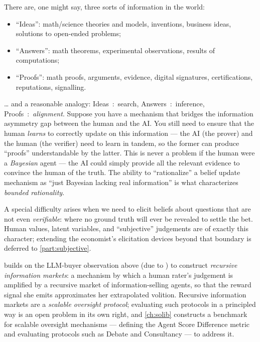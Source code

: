 There are, one might say, three sorts of information in the world:
\begin{itemize}
\item ``Ideas'': math/science theories and models, inventions, business ideas, solutions to open-ended problems;
\item ``Answers'': math theorems, experimental observations, results of computations;
\item ``Proofs'': math proofs, arguments, evidence, digital signatures, certifications, reputations, signalling.
\end{itemize}
\ldots{} and a reasonable analogy: Ideas~:~search, Answers~:~inference, Proofs~:~\emph{alignment}. Suppose you have a mechanism that bridges the information asymmetry gap between the human and the AI. You still need to ensure that the human \emph{learns} to correctly update on this information --- the AI (the prover) and the human (the verifier) need to learn in tandem, so the former can produce ``proofs'' understandable by the latter. This is never a problem if the human were a \emph{Bayesian} agent --- the AI could simply provide all the relevant evidence to convince the human of the truth. The ability to ``rationalize'' a belief update mechanism as ``just Bayesian lacking real information'' is what characterizes \emph{bounded rationality}.

\begin{draftblock}
A special difficulty arises when we need to elicit beliefs about questions that are not even \emph{verifiable}: where no ground truth will ever be revealed to settle the bet. Human values, latent variables, and ``subjective'' judgements are of exactly this character; extending the economist's elicitation devices beyond that boundary is deferred to \cref{part:subjective}.

 builds on the LLM-buyer observation above (due to \citealt{weissRedesigningInformationMarkets2024}) to construct \emph{recursive information markets}: a mechanism by which a human rater's judgement is amplified by a recursive market of information-selling agents, so that the reward signal she emits approximates her extrapolated volition. Recursive information markets are a \emph{scalable oversight protocol}; evaluating such protocols in a principled way is an open problem in its own right, and \cref{ch:solib} constructs a benchmark for scalable oversight mechanisms --- defining the Agent Score Difference metric and evaluating protocols such as Debate and Consultancy --- to address it.
\end{draftblock}
